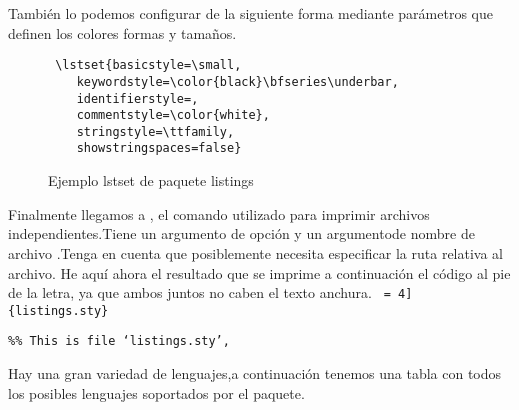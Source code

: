 También lo podemos configurar de la siguiente forma mediante parámetros que definen los colores formas y tamaños.
\begin{figure}[htb]
\begin{verbatim}
 \lstset{basicstyle=\small,          
    keywordstyle=\color{black}\bfseries\underbar,                          
    identifierstyle=,           
    commentstyle=\color{white}, 
    stringstyle=\ttfamily,      
    showstringspaces=false}   
 \end{verbatim}
\caption{Ejemplo lstset de paquete listings}
\end{figure}
Finalmente llegamos a \verb||, el comando utilizado para imprimir archivos independientes.Tiene un argumento de opción y un argumentode  nombre de archivo .Tenga en cuenta que posiblemente necesita especificar la ruta relativa al archivo. He aquí ahora el resultado que se imprime a continuación el código al pie de la letra, ya que ambos juntos no caben el texto anchura.
  \verb| = 4] {listings.sty}|
\begin{verbatim}
%% This is file ‘listings.sty’,
\end{verbatim}

		
Hay una gran variedad de lenguajes,a continuación tenemos una tabla con todos los posibles lenguajes soportados por el paquete.\\

